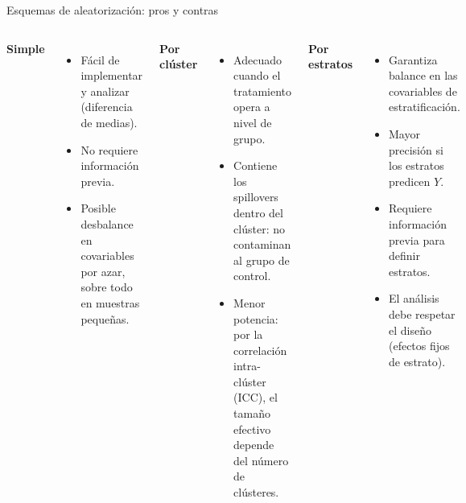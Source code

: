 \documentclass[10pt, xcolor=dvipsnames]{beamer}
\begin{document}
\begin{frame}{Esquemas de aleatorización: pros y contras}
\small
\begin{columns}[t,totalwidth=\textwidth]
\textbf{Simple}
\begin{itemize}\itemsep4pt
  \item[\textcolor{green!60!black}{\textbf{+}}] Fácil de implementar y analizar (diferencia de medias).  
  \item[\textcolor{green!60!black}{\textbf{+}}] No requiere información previa.  
  \item[\textcolor{red!70!black}{\textbf{--}}] Posible desbalance en covariables por azar, sobre todo en muestras pequeñas.  
\end{itemize}
\textbf{Por clúster}
\begin{itemize}\itemsep4pt
  \item[\textcolor{green!60!black}{\textbf{+}}] Adecuado cuando el tratamiento opera a nivel de grupo.  
  \item[\textcolor{green!60!black}{\textbf{+}}] Contiene los spillovers dentro del clúster: no contaminan al grupo de control.  
  \item[\textcolor{red!70!black}{\textbf{--}}] Menor potencia: por la correlación intra-clúster (ICC), el tamaño efectivo depende del número de clústeres.  
\end{itemize}
\textbf{Por estratos}
\begin{itemize}\itemsep4pt
  \item[\textcolor{green!60!black}{\textbf{+}}] Garantiza balance en las covariables de estratificación.  
  \item[\textcolor{green!60!black}{\textbf{+}}] Mayor precisión si los estratos predicen \(Y\).  
  \item[\textcolor{red!70!black}{\textbf{--}}] Requiere información previa para definir estratos.  
  \item[\textcolor{red!70!black}{\textbf{--}}] El análisis debe respetar el diseño (efectos fijos de estrato).  
\end{itemize}
\end{columns}
\end{frame}


\end{document}
